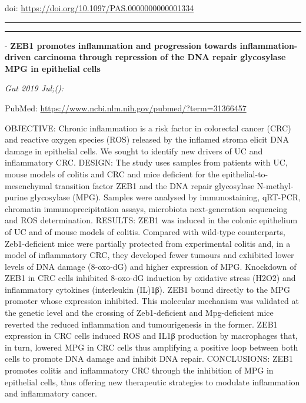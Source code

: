 \documentclass[]{article}
\begin{document}
doi: \url{https://doi.org/10.1097/PAS.0000000000001334}

{}

{}

\begin{center}\rule{0.5\linewidth}{\linethickness}\end{center}

\begin{center}\rule{0.5\linewidth}{\linethickness}\end{center}

 - \textbf{ZEB1 promotes inflammation and progression towards
inflammation-driven carcinoma through repression of the DNA repair
glycosylase MPG in epithelial cells}

\emph{Gut 2019 Jul;():}

PubMed: \url{https://www.ncbi.nlm.nih.gov/pubmed/?term=31366457}

OBJECTIVE: Chronic inflammation is a risk factor in colorectal cancer
(CRC) and reactive oxygen species (ROS) released by the inflamed stroma
elicit DNA damage in epithelial cells. We sought to identify new drivers
of UC and inflammatory CRC. DESIGN: The study uses samples from patients
with UC, mouse models of colitis and CRC and mice deficient for the
epithelial-to-mesenchymal transition factor ZEB1 and the DNA repair
glycosylase N-methyl-purine glycosylase (MPG). Samples were analysed by
immunostaining, qRT-PCR, chromatin immunoprecipitation assays,
microbiota next-generation sequencing and ROS determination. RESULTS:
ZEB1 was induced in the colonic epithelium of UC and of mouse models of
colitis. Compared with wild-type counterparts, Zeb1-deficient mice were
partially protected from experimental colitis and, in a model of
inflammatory CRC, they developed fewer tumours and exhibited lower
levels of DNA damage (8-oxo-dG) and higher expression of MPG. Knockdown
of ZEB1 in CRC cells inhibited 8-oxo-dG induction by oxidative stress
(H2O2) and inflammatory cytokines (interleukin (IL)1β). ZEB1 bound
directly to the MPG promoter whose expression inhibited. This molecular
mechanism was validated at the genetic level and the crossing of
Zeb1-deficient and Mpg-deficient mice reverted the reduced inflammation
and tumourigenesis in the former. ZEB1 expression in CRC cells induced
ROS and IL1β production by macrophages that, in turn, lowered MPG in CRC
cells thus amplifying a positive loop between both cells to promote DNA
damage and inhibit DNA repair. CONCLUSIONS: ZEB1 promotes colitis and
inflammatory CRC through the inhibition of MPG in epithelial cells, thus
offering new therapeutic strategies to modulate inflammation and
inflammatory cancer.
\end{document}
